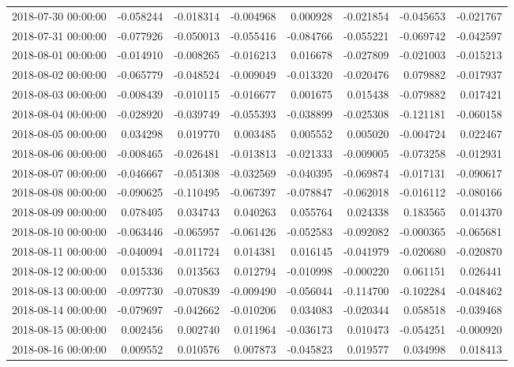 \begin{tabular}{lrrrrrrr}
2018-07-30 00:00:00 & -0.058244 & -0.018314 & -0.004968 & 0.000928 & -0.021854 & -0.045653 & -0.021767 \\
2018-07-31 00:00:00 & -0.077926 & -0.050013 & -0.055416 & -0.084766 & -0.055221 & -0.069742 & -0.042597 \\
2018-08-01 00:00:00 & -0.014910 & -0.008265 & -0.016213 & 0.016678 & -0.027809 & -0.021003 & -0.015213 \\
2018-08-02 00:00:00 & -0.065779 & -0.048524 & -0.009049 & -0.013320 & -0.020476 & 0.079882 & -0.017937 \\
2018-08-03 00:00:00 & -0.008439 & -0.010115 & -0.016677 & 0.001675 & 0.015438 & -0.079882 & 0.017421 \\
2018-08-04 00:00:00 & -0.028920 & -0.039749 & -0.055393 & -0.038899 & -0.025308 & -0.121181 & -0.060158 \\
2018-08-05 00:00:00 & 0.034298 & 0.019770 & 0.003485 & 0.005552 & 0.005020 & -0.004724 & 0.022467 \\
2018-08-06 00:00:00 & -0.008465 & -0.026481 & -0.013813 & -0.021333 & -0.009005 & -0.073258 & -0.012931 \\
2018-08-07 00:00:00 & -0.046667 & -0.051308 & -0.032569 & -0.040395 & -0.069874 & -0.017131 & -0.090617 \\
2018-08-08 00:00:00 & -0.090625 & -0.110495 & -0.067397 & -0.078847 & -0.062018 & -0.016112 & -0.080166 \\
2018-08-09 00:00:00 & 0.078405 & 0.034743 & 0.040263 & 0.055764 & 0.024338 & 0.183565 & 0.014370 \\
2018-08-10 00:00:00 & -0.063446 & -0.065957 & -0.061426 & -0.052583 & -0.092082 & -0.000365 & -0.065681 \\
2018-08-11 00:00:00 & -0.040094 & -0.011724 & 0.014381 & 0.016145 & -0.041979 & -0.020680 & -0.020870 \\
2018-08-12 00:00:00 & 0.015336 & 0.013563 & 0.012794 & -0.010998 & -0.000220 & 0.061151 & 0.026441 \\
2018-08-13 00:00:00 & -0.097730 & -0.070839 & -0.009490 & -0.056044 & -0.114700 & -0.102284 & -0.048462 \\
2018-08-14 00:00:00 & -0.079697 & -0.042662 & -0.010206 & 0.034083 & -0.020344 & 0.058518 & -0.039468 \\
2018-08-15 00:00:00 & 0.002456 & 0.002740 & 0.011964 & -0.036173 & 0.010473 & -0.054251 & -0.000920 \\
2018-08-16 00:00:00 & 0.009552 & 0.010576 & 0.007873 & -0.045823 & 0.019577 & 0.034998 & 0.018413 \\

\end{tabular}
